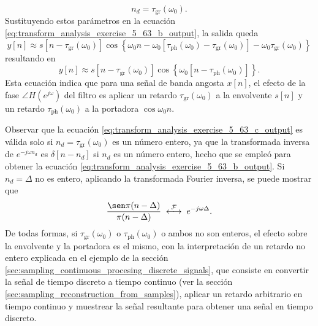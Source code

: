 \documentclass[a4paper]{report}
\begin{document}
\begin{enumerate}
\[  n_d=\tau_\textrm{gr}(\omega_0).
 \]
 Sustituyendo estos parámetros en la ecuación \ref{eq:transform_analysis_exercise_5_63_b_output}, la salida queda
 \[
  y[n]\approx s[n-\tau_\textrm{gr}(\omega_0)]\cos\left\{\omega_0n-\omega_0[\tau_\textrm{ph}(\omega_0)-\tau_\textrm{gr}(\omega_0)]-\omega_0\tau_\textrm{gr}(\omega_0)\right\}
 \]
 resultando en 
 \begin{equation}\label{eq:transform_analysis_exercise_5_63_c_output}
  y[n]\approx s[n-\tau_\textrm{gr}(\omega_0)]\cos\left\{\omega_0[n-\tau_\textrm{ph}(\omega_0)]\right\}.  
 \end{equation}
 Esta ecuación indica que para una señal de banda angosta \(x[n]\), el efecto de la fase \(\angle H(e^{j\omega})\) del filtro es aplicar un retardo \(\tau_\textrm{gr}(\omega_0)\) a la envolvente \(s[n]\) y un retardo \(\tau_\textrm{ph}(\omega_0)\) a la portadora \(\cos\omega_0n\).
 
 Observar que la ecuación \ref{eq:transform_analysis_exercise_5_63_c_output} es válida solo si \(n_d=\tau_\textrm{gr}(\omega_0)\) es un número entero, ya que la transformada inversa de \(e^{-j\omega n_d}\) es \(\delta[n-n_d]\) si \(n_d\) es un número entero, hecho que se empleó para obtener la ecuación \ref{eq:transform_analysis_exercise_5_63_b_output}. Si \(n_d=\Delta\) no es entero, aplicando la transformada Fourier inversa, se puede mostrar que 
 \[
  \frac{\sen\pi(n-\Delta)}{\pi(n-\Delta)}\;\overset{\mathcal{F}}{\longleftrightarrow}\;e^{-j\omega\Delta}.
 \]
 De todas formas, si \(\tau_\textrm{gr}(\omega_0)\) o \(\tau_\textrm{ph}(\omega_0)\) o ambos no son enteros, el efecto sobre la envolvente y la portadora es el mismo, con la interpretación de un retardo no entero explicada en el ejemplo de la sección \ref{sec:sampling_continuous_procesing_discrete_signals}, que consiste en convertir la señal de tiempo discreto a tiempo continuo (ver la sección \ref{sec:sampling_reconstruction_from_samples}), aplicar un retardo arbitrario en tiempo continuo y muestrear la señal resultante para obtener una señal en tiempo discreto.
 

\end{enumerate}
\end{document}
